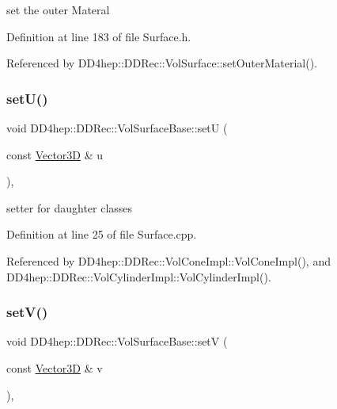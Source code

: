 set the outer Materal 



Definition at line 183 of file Surface.\+h.



Referenced by D\+D4hep\+::\+D\+D\+Rec\+::\+Vol\+Surface\+::set\+Outer\+Material().

\hypertarget{class_d_d4hep_1_1_d_d_rec_1_1_vol_surface_base_a8a39b98345cf8bb2ea7912b3974552e9}{}\label{class_d_d4hep_1_1_d_d_rec_1_1_vol_surface_base_a8a39b98345cf8bb2ea7912b3974552e9} 
\subsubsection{\texorpdfstring{set\+U()}{setU()}}
{\footnotesize\ttfamily void D\+D4hep\+::\+D\+D\+Rec\+::\+Vol\+Surface\+Base\+::setU (\begin{DoxyParamCaption}\item[{const \hyperlink{class_d_d_surfaces_1_1_vector3_d}{Vector3D} \&}]{u }\end{DoxyParamCaption})\hspace{0.3cm}{\ttfamily [protected]}, {\ttfamily [virtual]}}



setter for daughter classes 



Definition at line 25 of file Surface.\+cpp.



Referenced by D\+D4hep\+::\+D\+D\+Rec\+::\+Vol\+Cone\+Impl\+::\+Vol\+Cone\+Impl(), and D\+D4hep\+::\+D\+D\+Rec\+::\+Vol\+Cylinder\+Impl\+::\+Vol\+Cylinder\+Impl().

\hypertarget{class_d_d4hep_1_1_d_d_rec_1_1_vol_surface_base_a032025d40e5fee926713517ae36f5d4b}{}\label{class_d_d4hep_1_1_d_d_rec_1_1_vol_surface_base_a032025d40e5fee926713517ae36f5d4b} 
\subsubsection{\texorpdfstring{set\+V()}{setV()}}
{\footnotesize\ttfamily void D\+D4hep\+::\+D\+D\+Rec\+::\+Vol\+Surface\+Base\+::setV (\begin{DoxyParamCaption}\item[{const \hyperlink{class_d_d_surfaces_1_1_vector3_d}{Vector3D} \&}]{v }\end{DoxyParamCaption})\hspace{0.3cm}{\ttfamily [protected]}, {\ttfamily [virtual]}}



